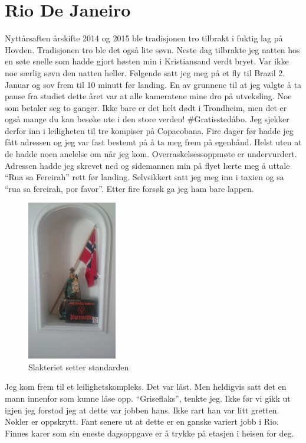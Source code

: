 \section*{Rio De Janeiro}
Nyttårsaften årskifte 2014 og 2015 ble tradisjonen tro tilbrakt i
fuktig lag på Hovden. Tradisjonen tro ble det også lite søvn. Neste
dag tilbrakte jeg natten hos en søte snelle som hadde gjort høsten
min i Kristiansand verdt bryet. Var ikke noe
særlig søvn den natten heller. Følgende satt jeg meg på et
fly til Brazil 2. Januar og sov frem til 10 minutt før landing. 
En av grunnene til at jeg valgte å ta pause fra studiet dette året var
at alle kameratene mine dro på utveksling. Noe som betaler seg to
ganger. Ikke bare er det helt dødt i Trondheim, men det er også mange
du kan besøke ute i den store verden! \#Gratisstedåbo. Jeg sjekker
derfor inn i leiligheten til tre kompiser på Copacobana.
Fire dager før hadde jeg fått adressen og jeg var fast bestemt på å ta
meg frem på egenhånd. Helst uten at de hadde noen anelelse om når jeg
kom. Overraskelsessoppmøte er undervurdert. Adressen hadde jeg skrevet
ned og sidemannen min på flyet lærte meg å uttale ``Rua sa Fereirah'' rett før
landing. Selvsikkert satt jeg meg inn i taxien og sa ``rua sa fereirah, por
favor''. Etter fire forsøk ga jeg ham bare lappen.\\ 
\begin{figure}
	\begin{center}
		\includegraphics[width=0.35\textwidth]{slakteriet}
	\end{center}
	\caption*{Slakteriet setter standarden}
\end{figure}
Jeg kom frem til et leilighetskompleks. Det var låst. Men heldigvis
satt det en mann innenfor som kunne låse opp. ``Griseflaks'', tenkte jeg.
Ikke før vi gikk ut igjen jeg forstod jeg at dette var jobben hans. Ikke
rart han var litt gretten. Nøkler
er oppskrytt. Fant senere ut at dette er en ganske variert jobb i Rio.
Finnes karer som sin eneste dagsoppgave er å trykke på etasjen i
heisen for deg. 

